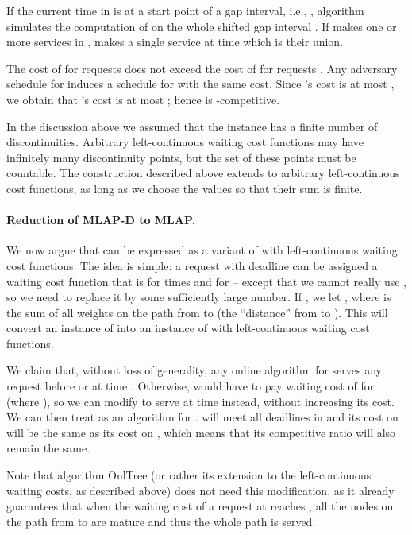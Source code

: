 \documentclass[a4paper]{article}
\newcommand{\OnAlgTreesGeneral}{{\sc OnlTree}}
\newcommand{\MLAP}{\mbox{\rm\textsf{MLAP}}}
\newcommand{\MLAPD}{\mbox{\rm\textsf{MLAP-D}}}
\begin{document}
If the current time  in  is at a start point of a
gap interval, i.e., , algorithm  simulates the
computation of  on the whole shifted gap interval
. If  makes one or more
services in ,  makes a
single service at time  which is their union.

The cost of  for requests  does not exceed the cost of
 for requests .  Any adversary schedule  for
 induces a schedule  for  with the same
cost. Since 's cost is at most , we
obtain that 's cost is at most ;
hence  is -competitive.

In the discussion above we assumed that the instance has a finite number
of discontinuities. Arbitrary left-continuous waiting
cost functions may have infinitely many discontinuity points, but the
set of these points must be countable. The construction described
above extends to arbitrary left-continuous cost functions, as long as
we choose the  values so that their sum is finite.


\paragraph{Reduction of {\MLAPD} to {\MLAP}.}

We now argue that  can be expressed as a
variant of  with left-continuous waiting cost functions. The idea
is simple: a
request  with deadline  can be assigned a waiting cost
function  that is  for times  and 
for  -- 
except that we cannot really use , so we need to replace it by
some sufficiently large number.
If , we let 
, where  is the sum of all
weights on the path from  to  (the ``distance'' from  to ).
This will convert an instance  of  into an
instance  of  with left-continuous waiting cost functions.

We claim that, without loss of generality, any online algorithm
 for  serves any request  before or at time .
Otherwise,  would have to pay waiting cost of  for 
(where ),
so we can modify  to serve  at time  instead,
without increasing its cost.
We can then treat  as an algorithm for .
 will meet all deadlines in  and its cost on  will be
the same as its cost on , which means that
its competitive ratio will also remain the same.

Note that algorithm {\OnAlgTreesGeneral} (or rather its extension to
the left-continuous waiting costs, as described above) does
not need this modification, as it already guarantees that when the
waiting cost of a request at  reaches , all the nodes on
the path from  to  are mature and thus the whole path is served.



\end{document}
